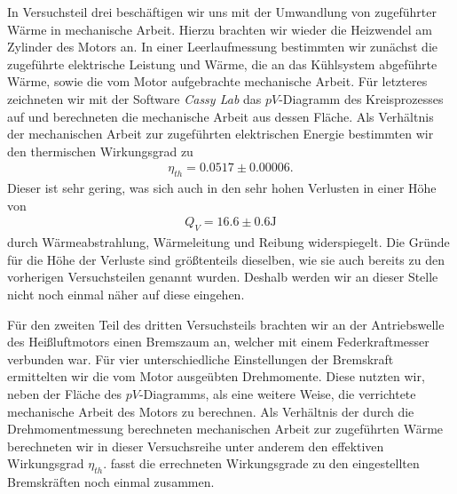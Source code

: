 In Versuchsteil drei beschäftigen wir uns mit der Umwandlung von zugeführter Wärme in mechanische Arbeit. Hierzu brachten wir wieder die Heizwendel am Zylinder des Motors an. In einer Leerlaufmessung bestimmten wir zunächst die zugeführte elektrische Leistung und Wärme, die an das Kühlsystem abgeführte Wärme, sowie die vom Motor aufgebrachte mechanische Arbeit. Für letzteres zeichneten wir mit der Software \textit{Cassy Lab} das $pV$-Diagramm des Kreisprozesses auf und berechneten die mechanische Arbeit aus dessen Fläche. Als Verhältnis der mechanischen Arbeit zur zugeführten elektrischen Energie bestimmten wir den thermischen Wirkungsgrad zu
\begin{align*}
  \eta_{th} = 0.0517 \pm 0.00006.
\end{align*}
Dieser ist sehr gering, was sich auch in den sehr hohen Verlusten in einer Höhe von
\begin{align*}
    Q_V = 16.6 \pm 0.6 \si{\joule}
\end{align*}
durch Wärmeabstrahlung, Wärmeleitung und Reibung widerspiegelt. Die Gründe für die Höhe der Verluste sind größtenteils dieselben, wie sie auch bereits zu den vorherigen Versuchsteilen genannt wurden. Deshalb werden wir an dieser Stelle nicht noch einmal näher auf diese eingehen.

Für den zweiten Teil des dritten Versuchsteils brachten wir an der Antriebswelle des Heißluftmotors einen Bremszaum an, welcher mit einem Federkraftmesser verbunden war. Für vier unterschiedliche Einstellungen der Bremskraft ermittelten wir die vom Motor ausgeübten Drehmomente. Diese nutzten wir, neben der Fläche des $pV$-Diagramms, als eine weitere Weise, die verrichtete mechanische Arbeit des Motors zu berechnen. Als Verhältnis der durch die Drehmomentmessung berechneten mechanischen Arbeit zur zugeführten Wärme berechneten wir in dieser Versuchsreihe unter anderem den effektiven Wirkungsgrad $\eta_{th}$.  fasst die errechneten Wirkungsgrade zu den eingestellten Bremskräften noch einmal zusammen.

